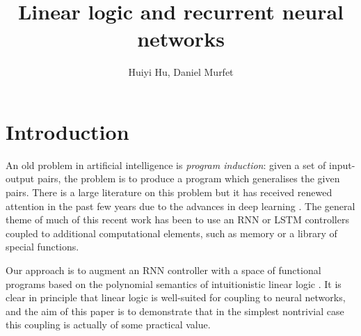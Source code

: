 \documentclass[english,letter paper,12pt,leqno]{article}
\theoremstyle{example}
\numberwithin{equation}{section}
\def\res{\operatorname{Res}}
\begin{document}
\def\Res{\res\!}
\newcommand{\ud}{\mathrm{d}}
\newcommand{\Ress}[1]{\res_{#1}\!}
\newcommand{\cat}[1]{\mathcal{#1}}
\newcommand{\lto}{\longrightarrow}
\newcommand{\xlto}[1]{\stackrel{#1}\lto}
\newcommand{\mf}[1]{\mathfrak{#1}}
\newcommand{\md}[1]{\mathscr{#1}}
\def\sus{\l}
\def\l{\,|\,}
\def\sgn{\textup{sgn}}
\newcommand{\den}[1]{\llbracket #1 \rrbracket}

\title{Linear logic and recurrent neural networks}
\author{Huiyi Hu, Daniel Murfet}

\maketitle

\section{Introduction}

An old problem in artificial intelligence is \emph{program induction}: given a set of input-output pairs, the problem is to produce a program which generalises the given pairs. There is a large literature on this problem \cite{??,??} but it has received renewed attention in the past few years due to the advances in deep learning \cite{??,??,??}. The general theme of much of this recent work has been to use an RNN or LSTM controllers coupled to additional computational elements, such as memory or a library of special functions.

Our approach is to augment an RNN controller with a space of functional programs based on the polynomial semantics of intuitionistic linear logic \cite{??}. It is clear in principle that linear logic is well-suited for coupling to neural networks, and the aim of this paper is to demonstrate that in the simplest nontrivial case this coupling is actually of some practical value. %

\end{document}
